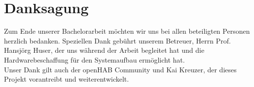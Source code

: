 \chapter*{Danksagung} 

Zum Ende unserer Bachelorarbeit möchten wir uns bei allen beteiligten Personen herzlich bedanken. Speziellen Dank gebührt unserem Betreuer, Herrn Prof. Hansjörg Huser, der uns während der Arbeit begleitet hat und die Hardwarebeschaffung für den Systemaufbau ermöglicht hat. \\
Unser Dank gilt auch der openHAB Community und Kai Kreuzer, der dieses Projekt vorantreibt und weiterentwickelt.